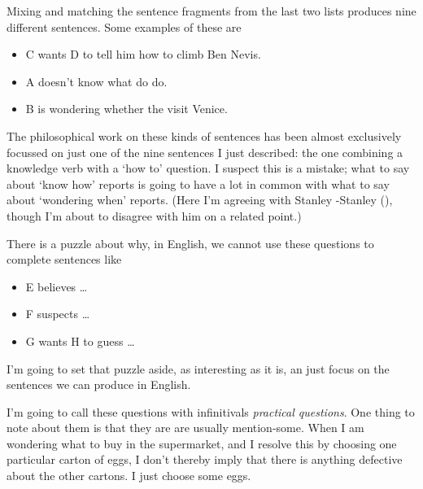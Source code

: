 \documentclass[
  12pt,
  letterpaper,
]{scrbook}
\providecommand{\tightlist}{%
  \setlength{\itemsep}{0pt}\setlength{\parskip}{0pt}}\usepackage{longtable,booktabs,array}
\begin{document}
Mixing and matching the sentence fragments from the last two lists
produces nine different sentences. Some examples of these are

\begin{itemize}
\tightlist
\item
  C wants D to tell him how to climb Ben Nevis.
\item
  A doesn't know what do do.
\item
  B is wondering whether the visit Venice.
\end{itemize}

The philosophical work on these kinds of sentences has been almost
exclusively focussed on just one of the nine sentences I just described:
the one combining a knowledge verb with a `how to' question. I suspect
this is a mistake; what to say about `know how' reports is going to have
a lot in common with what to say about `wondering when' reports. (Here
I'm agreeing with Stanley -Stanley (),
though I'm about to disagree with him on a related point.)

There is a puzzle about why, in English, we cannot use these questions
to complete sentences like

\begin{itemize}
\tightlist
\item
  E believes \ldots{}
\item
  F suspects \ldots{}
\item
  G wants H to guess \ldots{}
\end{itemize}

I'm going to set that puzzle aside, as interesting as it is, an just
focus on the sentences we can produce in English.

I'm going to call these questions with infinitivals \emph{practical
questions}. One thing to note about them is that they are are usually
mention-some. When I am wondering what to buy in the supermarket, and I
resolve this by choosing one particular carton of eggs, I don't thereby
imply that there is anything defective about the other cartons. I just
choose some eggs.
\end{document}
